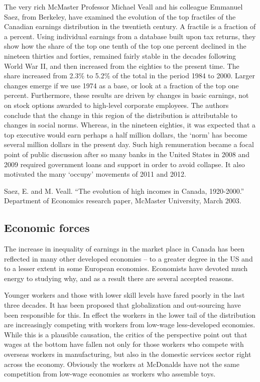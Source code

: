 \begin{ApplicationBox}{The very rich \label{app:veryrich}}
McMaster Professor Michael Veall and his colleague Emmanuel Saez, from Berkeley, have examined the evolution of the top fractiles of the Canadian earnings distribution in the twentieth century. A fractile is a fraction of a percent. Using individual earnings from a database built upon tax returns, they show how the share of the top one tenth of the top one percent declined in the nineteen thirties and forties, remained fairly stable in the decades following World War II, and then increased from the eighties to the present time. The share increased from 2.3\% to 5.2\% of the total in the period 1984 to 2000. Larger changes emerge if we use 1974 as a base, or look at a fraction of the top one percent. Furthermore, these results are driven by changes in basic earnings, not on stock options awarded to high-level corporate employees. The authors conclude that the change in this region of the distribution is attributable to changes in social norms. Whereas, in the nineteen eighties, it was expected that a top executive would earn perhaps a half million dollars, the `norm' has become several million dollars in the present day. Such high remuneration became a focal point of public discussion after so many banks in the United States in 2008 and 2009 required government loans and support in order to avoid collapse. It also motivated the many `occupy' movements of 2011 and 2012.

\bigskip
Saez, E. and M. Veall. ``The evolution of high incomes in Canada, 1920-2000.'' Department of Economics research paper, McMaster University, March 2003.
\end{ApplicationBox}

\subsection*{Economic forces}

The increase in inequality of earnings in the market place in Canada has been reflected in many other developed economies -- to a greater degree in the US and to a lesser extent in some European economies. Economists have devoted much energy to studying why, and as a result there are several accepted reasons.

Younger workers and those with lower skill levels have fared poorly in the last three decades. It has been proposed that globalization and out-sourcing have been responsible for this. In effect the workers in the lower tail of the distribution are increasingly competing with workers from low-wage less-developed economies. While this is a plausible causation, the critics of the perspective point out that wages at the bottom have fallen not only for those workers who compete with overseas workers in manufacturing, but also in the domestic services sector right across the economy. Obviously the workers at McDonalds have not the same competition from low-wage economies as workers who assemble toys.


